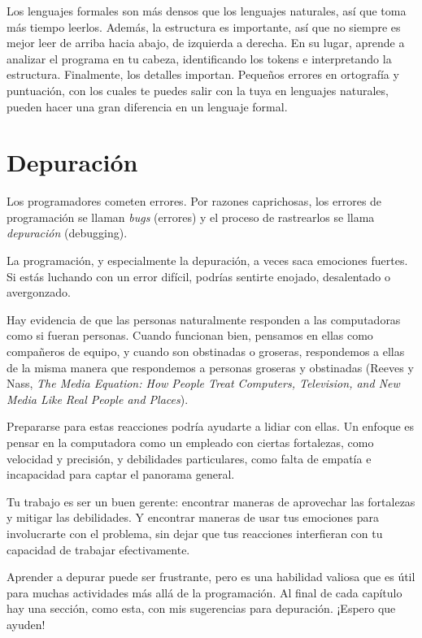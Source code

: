 \documentclass[12pt,letterpaper]{book}
\begin{document}
Los lenguajes formales son más densos que los lenguajes naturales, así que toma más tiempo leerlos. Además, la estructura es importante, así que no siempre es mejor leer de arriba hacia abajo, de izquierda a derecha. En su lugar, aprende a analizar el programa en tu cabeza, identificando los tokens e interpretando la estructura. Finalmente, los detalles importan. Pequeños errores en ortografía y puntuación, con los cuales te puedes salir con la tuya en lenguajes naturales, pueden hacer una gran diferencia en un lenguaje formal.

\section{Depuración}

Los programadores cometen errores. Por razones caprichosas, los errores de programación se llaman \textit{bugs} (errores) y el proceso de rastrearlos se llama \textit{depuración} (debugging).

La programación, y especialmente la depuración, a veces saca emociones fuertes. Si estás luchando con un error difícil, podrías sentirte enojado, desalentado o avergonzado.

Hay evidencia de que las personas naturalmente responden a las computadoras como si fueran personas. Cuando funcionan bien, pensamos en ellas como compañeros de equipo, y cuando son obstinadas o groseras, respondemos a ellas de la misma manera que respondemos a personas groseras y obstinadas (Reeves y Nass, \textit{The Media Equation: How People Treat Computers, Television, and New Media Like Real People and Places}).

Prepararse para estas reacciones podría ayudarte a lidiar con ellas. Un enfoque es pensar en la computadora como un empleado con ciertas fortalezas, como velocidad y precisión, y debilidades particulares, como falta de empatía e incapacidad para captar el panorama general. 

Tu trabajo es ser un buen gerente: encontrar maneras de aprovechar las fortalezas y mitigar las debilidades. Y encontrar maneras de usar tus emociones para involucrarte con el problema, sin dejar que tus reacciones interfieran con tu capacidad de trabajar efectivamente.

Aprender a depurar puede ser frustrante, pero es una habilidad valiosa que es útil para muchas actividades más allá de la programación. Al final de cada capítulo hay una sección, como esta, con mis sugerencias para depuración. ¡Espero que ayuden!
\end{document}
